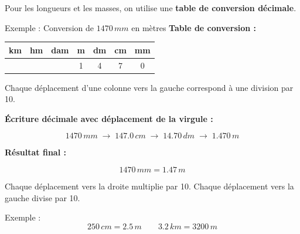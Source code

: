 \documentclass[11pt,a4paper]{article}
\newcommand{\theorybox}[2]{
\begin{tcolorbox}[title=\textbf{#1}]
#2
\end{tcolorbox}
}
\begin{document}
\theorybox{D - Conversion par déplacement de la virgule (longueurs, masses)}{
Pour les longueurs et les masses, on utilise une \textbf{table de conversion décimale}.

Exemple : Conversion de $1470\,\si{mm}$ en mètres
\textbf{Table de conversion :}

\begin{center}
\begin{tabular}{c|c|c|c|c|c|c}
km & hm & dam & m & dm & cm & mm \\
\hline
   &    &     & 1 & 4  & 7  & 0  \\
\end{tabular}
\end{center}

Chaque déplacement d’une colonne vers la gauche correspond à une division par 10.

\vspace{0.2cm}

\textbf{Écriture décimale avec déplacement de la virgule :}

\[
1470\,\si{mm}
\;\longrightarrow\;
147.\!0\,\si{cm}
\;\longrightarrow\;
14.\!70\,\si{dm}
\;\longrightarrow\;
1.\!470\,\si{m}
\]

\vspace{0.2cm}

\textbf{Résultat final :}

\[
1470\,\si{mm} = 1.47\,\si{m}
\]




Chaque déplacement vers la droite multiplie par 10.  
Chaque déplacement vers la gauche divise par 10.

Exemple :
\[
250\,\si{cm} = 2.5\,\si{m}
\qquad
3.2\,\si{km} = 3200\,\si{m}
\]
}
\end{document}
